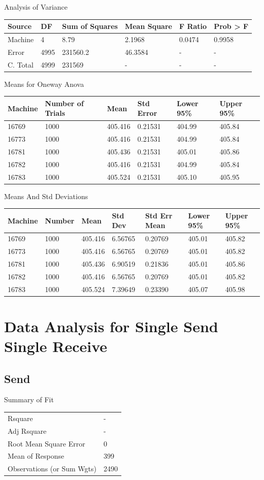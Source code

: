 \documentclass[12pt]{report}
\begin{document}
Analysis of Variance
\newline
\begin{tabular}{l | l | l | l | l | l}
  Source&DF&Sum of Squares&Mean Square&F Ratio&Prob > F \\
  \hline
  Machine&4&8.79&2.1968&0.0474&0.9958 \\
  Error&4995&231560.2&46.3584&-&- \\
  C. Total&4999&231569&-&-&- \\
\end{tabular}
\newline

Means for Oneway Anova
\newline
\begin{tabular}{l | l | l | l | l | l}
  Machine&Number of Trials&Mean&Std Error&Lower 95\%&Upper 95\% \\
  \hline
  16769&1000&405.416&0.21531&404.99&405.84 \\
  16773&1000&405.416&0.21531&404.99&405.84 \\
  16781&1000&405.436&0.21531&405.01&405.86 \\
  16782&1000&405.416&0.21531&404.99&405.84 \\
  16783&1000&405.524&0.21531&405.10&405.95 \\
\end{tabular}
\newline

Means And Std Deviations
\newline
\begin{tabular}{l | l | l | l | l | l |l}
  Machine&Number&Mean&Std Dev&Std Err Mean&Lower 95\%&Upper 95\% \\
  \hline
  16769&1000&405.416&6.56765&0.20769&405.01&405.82 \\
  16773&1000&405.416&6.56765&0.20769&405.01&405.82 \\
  16781&1000&405.436&6.90519&0.21836&405.01&405.86 \\
  16782&1000&405.416&6.56765&0.20769&405.01&405.82 \\
  16783&1000&405.524&7.39649&0.23390&405.07&405.98 \\
\end{tabular}
\newline

\section{Data Analysis for Single Send Single Receive}
\subsection{Send}
Summary of Fit
\newline
\begin{tabular}{l | l}
  Rsquare&- \\
  Adj Rsquare&- \\
  Root Mean Square Error&0 \\
  Mean of Response&399 \\
  Observations (or Sum Wgts)&2490 \\
\end{tabular}
\newline
\end{document}
